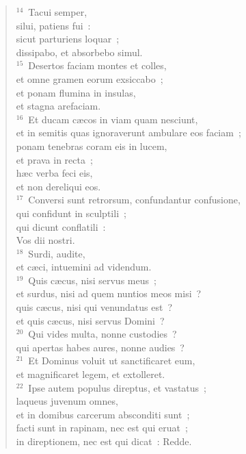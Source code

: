 \begin{verse}${}^{14}$~Tacui semper,\\ silui, patiens fui~:\\ sicut parturiens loquar~;\\ dissipabo, et absorbebo simul.\\
${}^{15}$~Desertos faciam montes et colles,\\ et omne gramen eorum exsiccabo~;\\ et ponam flumina in insulas,\\ et stagna arefaciam.\\
${}^{16}$~Et ducam c\ae cos in viam quam nesciunt,\\ et in semitis quas ignoraverunt ambulare eos faciam~;\\ ponam tenebras coram eis in lucem,\\ et prava in recta~;\\ h\ae c verba feci eis,\\ et non dereliqui eos.\\
${}^{17}$~Conversi sunt retrorsum, confundantur confusione,\\ qui confidunt in sculptili~;\\ qui dicunt conflatili~:\\ Vos dii nostri.\\
${}^{18}$~Surdi, audite,\\ et c\ae ci, intuemini ad videndum.\\
${}^{19}$~Quis c\ae cus, nisi servus meus~;\\ et surdus, nisi ad quem nuntios meos misi~?\\ quis c\ae cus, nisi qui venundatus est~?\\ et quis c\ae cus, nisi servus Domini~?\\
${}^{20}$~Qui vides multa, nonne custodies~?\\ qui apertas habes aures, nonne audies~?\\
${}^{21}$~Et Dominus voluit ut sanctificaret eum,\\ et magnificaret legem, et extolleret.\\
${}^{22}$~Ipse autem populus direptus, et vastatus~;\\ laqueus juvenum omnes,\\ et in domibus carcerum absconditi sunt~;\\ facti sunt in rapinam, nec est qui eruat~;\\ in direptionem, nec est qui dicat~: Redde.\\

\end{verse}
